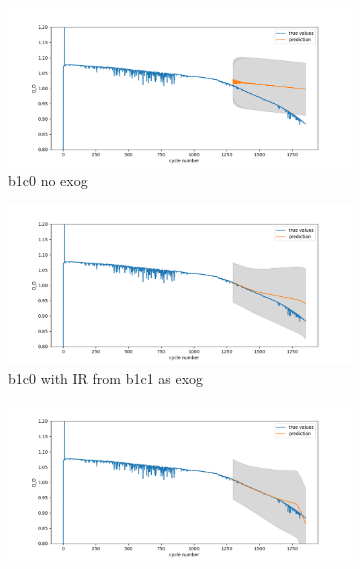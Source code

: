 \documentclass{article}
\begin{document}
\begin{figure}[H]
\centering
    \begin{subfigure}{.5\textwidth}
  \centering
  \includegraphics[width=1\linewidth]{figs/auto_ARIMA_no_exog_03split_b1c0.png}
  \caption{b1c0 no exog}
  \label{fig:sub1}
\end{subfigure}%
\begin{subfigure}{.5\textwidth}
  \centering
  \includegraphics[width=1\linewidth]{figs/auto_arima_exog(c1-IR)_03split_b1c0.png}
  \caption{b1c0 with IR from b1c1 as exog}
  \label{fig:sub2}
\end{subfigure}
\begin{subfigure}{.5\textwidth}
  \centering
  \includegraphics[width=1\linewidth]{figs/auto_arima_exog(c2-IR)_03split_b1c0.png}

\end{subfigure}
\end{figure}
\end{document}
